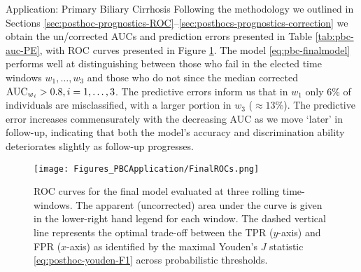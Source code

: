 \begin{chapter}{\label{cha:app-PBC}Application: Primary Biliary Cirrhosis}
  Following the methodology we outlined in Sections \ref{sec:posthoc-prognostics-ROC}--\ref{sec:posthocs-prognostics-correction} we obtain the un/corrected AUCs and prediction errors presented in Table \ref{tab:pbc-auc-PE}, with ROC curves presented in Figure \ref{fig:pbc-final-roc}. The model \eqref{eq:pbc-finalmodel} performs well at distinguishing between those who fail in the elected time windows $w_1,\dots,w_3$ and those who do not since the median corrected $\mathrm{AUC}_{w{_i}}>0.8, i=1,\dots,3$. The predictive errors inform us that in $w_1$ only 6\% of individuals are misclassified, with a larger portion in $w_3$ ($\approx13\%$). The predictive error increases commensurately with the decreasing AUC as we move `later' in follow-up, indicating that both the model's accuracy and discrimination ability deteriorates slightly as follow-up progresses.
  
  \begin{figure}[ht]
      \centering
      \texttt{[image: Figures\_PBCApplication/FinalROCs.png]}
      \caption{ROC curves for the final model evaluated at three rolling time-windows. The apparent (\ie uncorrected) area under the curve is given in the lower-right hand legend for each window. The dashed vertical line represents the optimal trade-off between the TPR ($y$-axis) and FPR ($x$-axis) as identified by the maximal Youden's $J$ statistic \eqref{eq:posthoc-youden-F1} across probabilistic thresholds.}
      \label{fig:pbc-final-roc}
  \end{figure}
  

\end{chapter}
